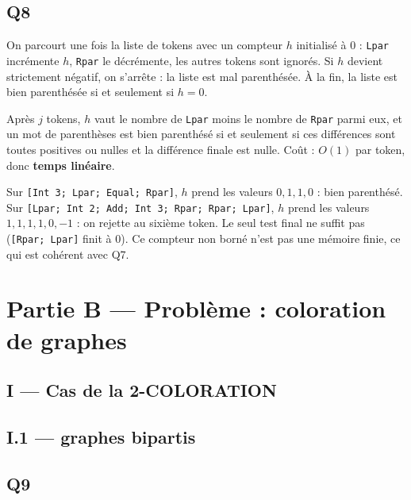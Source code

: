 \documentclass[11pt,a4paper]{article}
\begin{document}
\hypertarget{q8}{%
\subsection{Q8}\label{q8}}

On parcourt une fois la liste de tokens avec un compteur \(h\) initialisé à \(0\) : \texttt{Lpar} incrémente \(h\), \texttt{Rpar} le décrémente, les autres tokens sont ignorés. Si \(h\) devient strictement négatif, on s'arrête : la liste est mal parenthésée. À la fin, la liste est bien parenthésée si et seulement si \(h = 0\).

Après \(j\) tokens, \(h\) vaut le nombre de \texttt{Lpar} moins le nombre de \texttt{Rpar} parmi eux, et un mot de parenthèses est bien parenthésé si et seulement si ces différences sont toutes positives ou nulles et la différence finale est nulle. Coût : \(O(1)\) par token, donc \textbf{temps linéaire}.

Sur \texttt{{[}Int\ 3;\allowbreak{}\ Lpar;\allowbreak{}\ Equal;\allowbreak{}\ Rpar{]}\allowbreak{}}, \(h\) prend les valeurs \(0, 1, 1, 0\) : bien parenthésé. Sur \texttt{{[}Lpar;\allowbreak{}\ Int\ 2;\allowbreak{}\ Add;\allowbreak{}\ Int\ 3;\allowbreak{}\ Rpar;\allowbreak{}\ Rpar;\allowbreak{}\ Lpar{]}\allowbreak{}}, \(h\) prend les valeurs \(1, 1, 1, 1, 0, -1\) : on rejette au sixième token. Le seul test final ne suffit pas (\texttt{{[}Rpar;\ Lpar{]}} finit à \(0\)). Ce compteur non borné n'est pas une mémoire finie, ce qui est cohérent avec Q7.

\hypertarget{partie-b-probluxe8me-coloration-de-graphes}{%
\section{Partie B --- Problème : coloration de graphes}\label{partie-b-probluxe8me-coloration-de-graphes}}

\hypertarget{i-cas-de-la-2-coloration}{%
\subsection{I --- Cas de la 2-COLORATION}\label{i-cas-de-la-2-coloration}}

\hypertarget{i.1-graphes-bipartis}{%
\subsection{I.1 --- graphes bipartis}\label{i.1-graphes-bipartis}}

\hypertarget{q9}{%
\subsection{Q9}\label{q9}}
\end{document}
